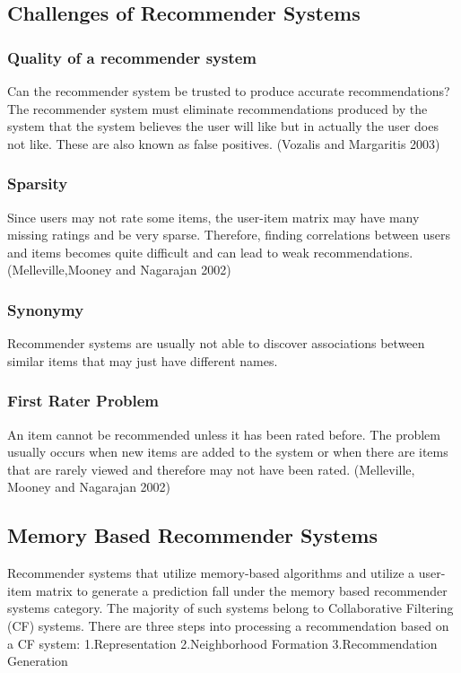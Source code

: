 \subsection{Challenges of Recommender Systems}
\subsubsection{Quality of a recommender system}
Can the recommender system be trusted to produce accurate recommendations? The recommender system must eliminate recommendations produced by the system that the system believes the user will like but in actually the user does not like. These are also known as false positives. (Vozalis and Margaritis 2003)
\subsubsection{Sparsity}
Since users may not rate some items, the user-item matrix may have many missing ratings and be very sparse. Therefore, finding correlations between users and items becomes quite difficult and can lead to weak recommendations. (Melleville,Mooney and Nagarajan 2002)
\subsubsection{Synonymy}
Recommender systems are usually not able to discover associations between similar items that may just have different names.
\subsubsection{First Rater Problem}
An item cannot be recommended unless it has been rated before. The problem usually occurs when new items are added to the system or when there are items that are rarely viewed and therefore may not have been rated. (Melleville, Mooney and Nagarajan 2002)
\subsection{Memory Based Recommender Systems}
Recommender systems that utilize memory-based algorithms and utilize a user-item matrix to generate a prediction fall under the memory based recommender systems category. The majority of such systems belong to Collaborative Filtering (CF) systems. There are three steps into processing a recommendation based on a CF system:
1.Representation
2.Neighborhood Formation
3.Recommendation Generation
